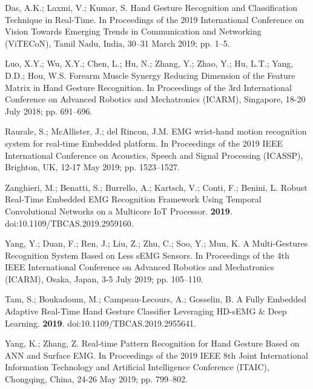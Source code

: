 \documentclass[sensors,review,accept,moreauthors,pdftex]{Definitions/mdpi}
\begin{document}
\begin{thebibliography}{999}
Das, A.K.; Laxmi, V.; Kumar, S.
\newblock Hand Gesture Recognition and Classification Technique in Real-Time.
In {Proceedings of the }  2019 International Conference on Vision Towards Emerging Trends in Communication and Networking (ViTECoN), Tamil Nadu, India, 30--31 March 2019; pp. 1--5.

Luo, X.Y.; Wu, X.Y.; Chen, L.; Hu, N.; Zhang, Y.; Zhao, Y.; Hu, L.T.; Yang,
  D.D.; Hou, W.S.
\newblock Forearm Muscle Synergy Reducing Dimension of the Feature Matrix in
  Hand Gesture Recognition.
In {Proceedings of the 3rd International Conference on Advanced Robotics and
  Mechatronics (ICARM),} Singapore, 18-20 July 2018; pp. 691--696.

Raurale, S.; McAllister, J.; del Rincon, J.M.
\newblock EMG wrist-hand motion recognition system for real-time Embedded
  platform.
In {Proceedings of the 2019 IEEE International Conference on Acoustics, Speech and Signal Processing (ICASSP),} Brighton, UK, 12-17 May 2019; pp. 1523--1527.

Zanghieri, M.; Benatti, S.; Burrello, A.; Kartsch, V.; Conti, F.; Benini, L.
\newblock Robust Real-Time Embedded EMG Recognition Framework Using Temporal
  Convolutional Networks on a Multicore IoT Processor.
 {\bf
  2019}. doi:10.1109/TBCAS.2019.2959160.

Yang, Y.; Duan, F.; Ren, J.; Liu, Z.; Zhu, C.; Soo, Y.; Mun, K.
\newblock A Multi-Gestures Recognition System Based on Less sEMG Sensors.
In {Proceedings of the 4th IEEE International Conference on Advanced Robotics and  Mechatronics (ICARM),} Osaka, Japan, 3-5 July 2019; pp. 105--110.

Tam, S.; Boukadoum, M.; Campeau-Lecours, A.; Gosselin, B.
\newblock A Fully Embedded Adaptive Real-Time Hand Gesture Classifier
  Leveraging HD-sEMG \& Deep Learning.
 {\bf
  2019}. doi:10.1109/TBCAS.2019.2955641.

Yang, K.; Zhang, Z.
\newblock Real-time Pattern Recognition for Hand Gesture Based on ANN and
  Surface EMG.
In {Proceedings of the }  2019 IEEE 8th Joint International Information Technology and Artificial Intelligence Conference (ITAIC), Chongqing, China, 24-26 May 2019; pp. 799--802.


\end{thebibliography}
\end{document}
